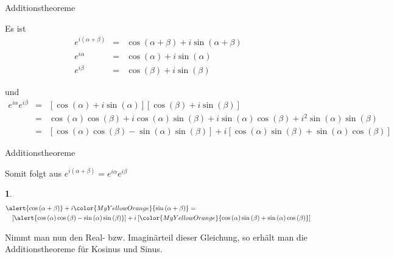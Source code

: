 \documentclass[german]{beamer}
\newcommand{\bq}{\begin{eqnarray*}}
\newcommand{\eq}{\end{eqnarray*}}
\newcommand{\superalert}[1]{{\color{MyYellowOrange}{#1}}}
\newtheorem*{myemptytheorem}{}
\begin{document}
\begin{frame}{Additionstheoreme}

Es ist
{\small
\bq
 e^{i \left(\alpha+\beta\right)} 
 & = &
 \cos\left(\alpha+\beta\right) + i \sin\left(\alpha+\beta\right)
 \nonumber \\
 e^{i \alpha} 
 & = &
 \cos\left(\alpha\right) + i \sin\left(\alpha\right)
 \nonumber \\
 e^{i \beta} 
 & = &
 \cos\left(\beta\right) + i \sin\left(\beta\right)
\eq
}

\vspace*{1mm} und
{\small
\bq
 e^{i \alpha} 
 e^{i \beta} 
 & = & 
 \left[ \cos\left(\alpha\right) + i \sin\left(\alpha\right) \right]
 \left[ \cos\left(\beta\right) + i \sin\left(\beta\right) \right]
 \nonumber \\
 & = &
 \cos\left(\alpha\right) \cos\left(\beta\right)
 + i \cos\left(\alpha\right) \sin\left(\beta\right)
 + i \sin\left(\alpha\right) \cos\left(\beta\right)
 + i^2 \sin\left(\alpha\right) \sin\left(\beta\right)
 \nonumber \\
 & = &
 \left[ \cos\left(\alpha\right) \cos\left(\beta\right)
 - \sin\left(\alpha\right) \sin\left(\beta\right) \right]
 + i \left[ \cos\left(\alpha\right) \sin\left(\beta\right)
 + \sin\left(\alpha\right) \cos\left(\beta\right) \right]
\eq
}

\end{frame}

\begin{frame}{Additionstheoreme}

Somit folgt aus $e^{i \left(\alpha+\beta\right)} = e^{i \alpha} e^{i \beta}$
\begin{myemptytheorem}
\bq
\lefteqn{
 \alert{\cos\left(\alpha+\beta\right)} + i \superalert{\sin\left(\alpha+\beta\right)}
 = } & &
 \nonumber \\
 & &
 \left[ \alert{\cos\left(\alpha\right) \cos\left(\beta\right) - \sin\left(\alpha\right) \sin\left(\beta\right)} \right]
 + i \left[ \superalert{\cos\left(\alpha\right) \sin\left(\beta\right) + \sin\left(\alpha\right) \cos\left(\beta\right)} \right]
\eq
\end{myemptytheorem}
Nimmt man nun den Real- bzw. Imagin\"arteil dieser Gleichung, so erh\"alt man die Additionstheoreme f\"ur Kosinus und Sinus.

\end{frame}


\begin{frame}

\end{frame}
\end{document}
